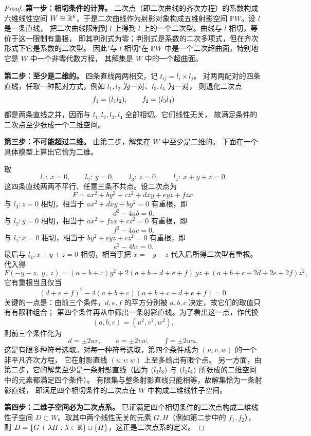 \begin{proof}
\textbf{第一步：相切条件的计算。} 二次点（即二次曲线的齐次方程）的系数构成六维线性空间
$W\cong\mathbb{R}^6$，于是二次曲线作为射影对象构成五维射影空间 $\mathbb{P}W$。设 $l$ 是一条直线，
把二次曲线限制到 $l$ 上得到 $l$ 上的一个二次型。曲线与 $l$ 相切，等价于这一限制有重根，
即其判别式为零；判别式是系数的二次多项式，但在齐次形式下它是系数的二次型。
因此"与 $l$ 相切"在 $\mathbb{P}W$ 中是一个二次超曲面，特别地它是 $W$ 中一个非零代数方程，
其解集是 $W$ 中的一个超曲面。

\textbf{第二步：至少是二维的。} 四条直线两两相交，记 $t_{ij}=l_i\times l_j$。
对两两配对的四条直线，任取一种配对方式，例如 $l_1,l_2$ 为一对、$l_3,l_4$ 为一对，
则退化二次点
\[
f_1=(l_1l_2),\qquad f_2=(l_3l_4)
\]
都是两条直线之并，因而与 $l_1,l_2,l_3,l_4$ 全部相切。它们线性无关，
故满足条件的二次点至少张成一个二维空间。

\textbf{第三步：不可能超过二维。} 由第二步，解集在 $W$ 中至少是二维的。
下面在一个具体模型上算出它恰为二维。

取
\[
l_1:\ x=0,\qquad l_2:\ y=0,\qquad l_3:\ z=0,\qquad l_4:\ x+y+z=0 .
\]
这四条直线两两不平行、任意三条不共点。设二次点为
\[
F=ax^2+by^2+cz^2+dxy+eyz+fzx .
\]
与 $l_3:z=0$ 相切，相当于 $ax^2+dxy+by^2=0$ 有重根，即
\[
d^2-4ab=0 .
\]
与 $l_2:y=0$ 相切，相当于 $ax^2+fzx+cz^2=0$ 有重根，即
\[
f^2-4ac=0 .
\]
与 $l_1:x=0$ 相切，相当于 $by^2+eyz+cz^2=0$ 有重根，即
\[
e^2-4bc=0 .
\]
最后与 $l_4:x+y+z=0$ 相切，相当于把 $x=-y-z$ 代入后所得二次型有重根。代入得
\[
F(-y-z,\;y,\;z)
=(a+b+c)y^2+2(a+b+d+e+f)\,yz+(a+b+c+2d+2e+2f)z^2 ,
\]
它有重根当且仅当
\[
(d+e+f)^2-4(a+b+c)(a+b+c+d+e+f)=0 .
\]
关键的一点是：由前三个条件，$d,e,f$ 的平方分别被 $a,b,c$ 决定，故它们的取值只有有限种组合；
第四个条件再从中筛出一条射影直线。为了看出这一点，作代换
\[
(a,b,c)=(u^2,v^2,w^2),
\]
则前三个条件化为
\[
d=\pm 2uv,\qquad e=\pm 2vw,\qquad f=\pm 2wu ,
\]
这是有限多种符号选取。对每一种符号选取，第四个条件成为 $(u,v,w)$ 的一个非平凡齐次方程，
它在射影直线 $(u:v:w)$ 上至多给出有限个点。
另一方面，由第二步，它的解集至少是一条射影直线（因为
$(l_1l_3)$ 与 $(l_2l_4)$ 所张成的二维空间中的元素都满足四个条件）。
有限集与整条射影直线只能相等，故解集恰为一条射影直线，
即满足四个相切条件的二次点在 $W$ 中构成二维线性子空间。

\textbf{第四步：二维子空间必为二次点系。} 已证满足四个相切条件的二次点构成二维线性子空间
$D\subset W$。取其中两个线性无关的元素 $G,H$（例如第二步中的 $f_1,f_2$），
则 $D=\{G+\lambda H:\lambda\in\mathbb{R}\}\cup\{H\}$，这正是二次点系的定义。
\end{proof}

